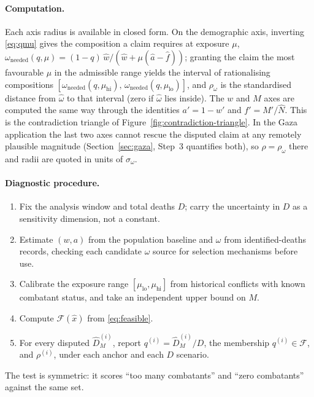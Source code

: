 \paragraph{Computation.} Each axis radius is available in closed form. On the demographic axis, inverting \eqref{eq:qmu} gives the composition a claim requires at exposure $\mu$, $\omega_{\mathrm{needed}}(q,\mu)=(1-q)\,\hat w/(\hat w+\mu(\hat a-\hat f))$; granting the claim the most favourable $\mu$ in the admissible range yields the interval of rationalising compositions $[\omega_{\mathrm{needed}}(q,\mu_{\mathrm{hi}}),\,\omega_{\mathrm{needed}}(q,\mu_{\mathrm{lo}})]$, and $\rho_\omega$ is the standardised distance from $\hat\omega$ to that interval (zero if $\hat\omega$ lies inside). The $w$ and $M$ axes are computed the same way through the identities $a'=1-w'$ and $f'=M'/\hat N$. This is the contradiction triangle of Figure~\ref{fig:contradiction-triangle}. In the Gaza application the last two axes cannot rescue the disputed claim at any remotely plausible magnitude (Section~\ref{sec:gaza}, Step~3 quantifies both), so $\rho=\rho_\omega$ there and radii are quoted in units of $\sigma_\omega$.

\paragraph{Diagnostic procedure.}
\begin{enumerate}[label=\textbf{D\arabic*.},leftmargin=*]
\item Fix the analysis window and total deaths $D$; carry the uncertainty in $D$ as a sensitivity dimension, not a constant.
\item Estimate $(w,a)$ from the population baseline and $\omega$ from identified-deaths records, checking each candidate $\omega$ source for selection mechanisms before use.
\item Calibrate the exposure range $[\mu_{\mathrm{lo}},\mu_{\mathrm{hi}}]$ from historical conflicts with known combatant status, and take an independent upper bound on $M$.
\item Compute $\mathcal F(\hat x)$ from \eqref{eq:feasible}.
\item For every disputed $\hat D_M^{(i)}$, report $q^{(i)}=\hat D_M^{(i)}/D$, the membership $q^{(i)}\in\mathcal F$, and $\rho^{(i)}$, under each anchor and each $D$ scenario.
\end{enumerate}
The test is symmetric: it scores ``too many combatants'' and ``zero combatants'' against the same set.
